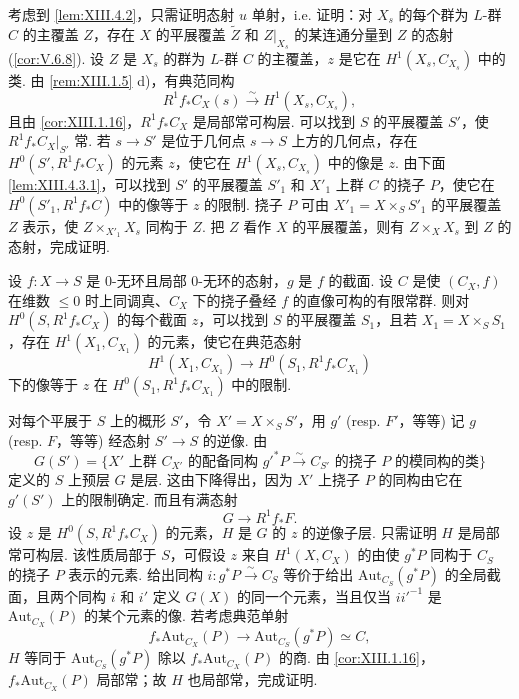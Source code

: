 考虑到 \ref{lem:XIII.4.2}，只需证明态射 $u$ 单射，i.e. 证明：对 $X_s$ 的每个群为 $L$-群 $C$ 的主覆盖 $Z$，存在 $X$ 的平展覆盖 $\widetilde{Z}$ 和 $Z|_{X_s}$ 的某连通分量到 $Z$ 的态射 (\cref{cor:V.6.8}). 设 $Z$ 是 $X_s$ 的群为 $L$-群 $C$ 的主覆盖，$z$ 是它在 $H^1(X_s, C_{X_s})$ 中的类. 由 \ref{rem:XIII.1.5} d)，有典范同构
\[
R^1 f_* C_X(s) \xrightarrow{\sim} H^1(X_s, C_{X_s}),
\]
且由 \ref{cor:XIII.1.16}，$R^1 f_* C_X$ 是局部常可构层. 可以找到 $S$ 的平展覆盖 $S'$，使 $R^1 f_* C_X|_{S'}$ 常. 若 $s \to S'$ 是位于几何点 $s \to S$ 上方的几何点，存在 $H^0(S', R^1 f_* C_X)$ 的元素 $z$，使它在 $H^1(X_s, C_{X_s})$ 中的像是 $z$. 由下面\cref{lem:XIII.4.3.1}，可以找到 $S'$ 的平展覆盖 $S'_1$ 和 $X'_1$ 上群 $C$ 的挠子 $P$，使它在 $H^0(S'_1, R^1 f_* C)$ 中的像等于 $z$ 的限制. 挠子 $P$ 可由 $X'_1 = X \times_S S'_1$ 的平展覆盖 $Z$ 表示，使 $Z \times_{X'_1} X_s$ 同构于 $Z$. 把 $Z$ 看作 $X$ 的平展覆盖，则有 $Z \times_X X_s$ 到 $Z$ 的态射，完成证明.

\begin{lemma}\label{lem:XIII.4.3.1}
设 $f \colon X \to S$ 是 0-无环且局部 0-无环的态射，$g$ 是 $f$ 的截面. 设 $C$ 是使 $(C_X, f)$ 在维数 $\leqslant 0$ 时上同调真、$C_X$ 下的挠子叠经 $f$ 的直像可构的有限常群. 则对 $H^0(S, R^1 f_* C_X)$ 的每个截面 $z$，可以找到 $S$ 的平展覆盖 $S_1$，且若 $X_1 = X \times_S S_1$，存在 $H^1(X_1, C_{X_1})$ 的元素，使它在典范态射
\[
H^1(X_1, C_{X_1}) \longrightarrow H^0(S_1, R^1 f_* C_{X_1})
\]
下的像等于 $z$ 在 $H^0(S_1, R^1 f_* C_{X_1})$ 中的限制.
\end{lemma}

对每个平展于 $S$ 上的概形 $S'$，令 $X' = X \times_S S'$，用 $g'$ (resp. $F'$，等等) 记 $g$ (resp. $F$，等等) 经态射 $S' \to S$ 的逆像. 由
\[
G(S') = \{X' \text{ 上群 } C_{X'} \text{ 的配备同构 } g'^{*} P \xrightarrow{\sim} C_{S'} \text{ 的挠子 } P \text{ 的模同构的类}\}
\]
定义的 $S$ 上预层 $G$ 是层. 这由下降得出，因为 $X'$ 上挠子 $P$ 的同构由它在 $g'(S')$ 上的限制确定. 而且有满态射
\[
G \longrightarrow R^1 f_* F.
\]
设 $z$ 是 $H^0(S, R^1 f_* C_X)$ 的元素，$H$ 是 $G$ 的 $z$ 的逆像子层. 只需证明 $H$ 是局部常可构层. 该性质局部于 $S$，可假设 $z$ 来自 $H^1(X, C_X)$ 的由使 $g^{*} P$ 同构于 $C_S$ 的挠子 $P$ 表示的元素. 给出同构 $i \colon g^{*} P \xrightarrow{\sim} C_S$ 等价于给出 $\mathrm{Aut}_{C_S}(g^{*} P)$ 的全局截面，且两个同构 $i$ 和 $i'$ 定义 $G(X)$ 的同一个元素，当且仅当 $ii'^{-1}$ 是 $\mathrm{Aut}_{C_X}(P)$ 的某个元素的像. 若考虑典范单射
\[
f_* \mathrm{Aut}_{C_X}(P) \longrightarrow \mathrm{Aut}_{C_S}(g^{*} P) \simeq C,
\]
$H$ 等同于 $\mathrm{Aut}_{C_S}(g^{*} P)$ 除以 $f_* \mathrm{Aut}_{C_X}(P)$ 的商. 由 \ref{cor:XIII.1.16}，$f_* \mathrm{Aut}_{C_X}(P)$ 局部常；故 $H$ 也局部常，完成证明.

